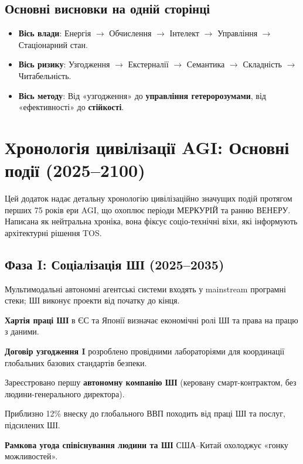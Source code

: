 \documentclass[11pt]{article}
\begin{document}
\subsection{Основні висновки на одній сторінці}
\begin{itemize}[noitemsep]
  \item \textbf{Вісь влади}: Енергія $\rightarrow$ Обчислення $\rightarrow$ Інтелект $\rightarrow$ Управління $\rightarrow$ Стаціонарний стан.
  \item \textbf{Вісь ризику}: Узгодження $\rightarrow$ Екстерналії $\rightarrow$ Семантика $\rightarrow$ Складність $\rightarrow$ Читабельність.
  \item \textbf{Вісь методу}: Від «узгодження» до \textbf{управління гетеророзумами}, від «ефективності» до \textbf{стійкості}.
\end{itemize}

\newpage

\section{Хронологія цивілізації AGI: Основні події (2025–2100)}
\label{appendix:timeline}

Цей додаток надає детальну хронологію цивілізаційно значущих подій протягом перших 75 років ери AGI, що охоплює періоди МЕРКУРІЙ та ранню ВЕНЕРУ. Написана як нейтральна хроніка, вона фіксує соціо-технічні віхи, які інформують архітектурні рішення TOS.

\subsection{Фаза I: Соціалізація ШІ (2025–2035)}
\begin{description}[style=nextline,leftmargin=2cm]
  \item[2026] Мультимодальні автономні агентські системи входять у mainstream програмні стеки; ШІ виконує проекти від початку до кінця.
  \item[2028] \textbf{Хартія праці ШІ} в ЄС та Японії визначає економічні ролі ШІ та права на працю з даними.
  \item[2029] \textbf{Договір узгодження I} розроблено провідними лабораторіями для координації глобальних базових стандартів безпеки.
  \item[2030] Зареєстровано першу \textbf{автономну компанію ШІ} (керовану смарт-контрактом, без людини-генерального директора).
  \item[2032] Приблизно 12\% внеску до глобального ВВП походить від праці ШІ та послуг, підсилених ШІ.
  \item[2034] \textbf{Рамкова угода співіснування людини та ШІ} США–Китай охолоджує «гонку можливостей».
\end{description}
\end{document}
